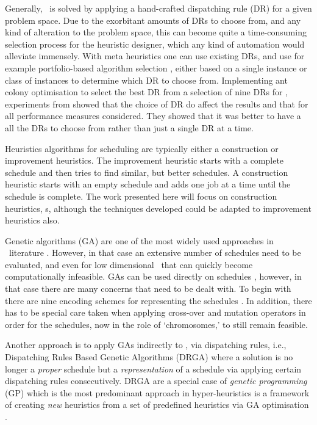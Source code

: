 \documentclass[smallextended]{svjour3}
\begin{document}
Generally, \jsp\ is solved by applying a hand-crafted dispatching rule (DR) for 
a given problem space. 
Due to the exorbitant amounts of DRs to choose from, and any kind of alteration 
to the problem space, this can become quite a time-consuming selection process 
for the heuristic designer, which any kind of automation would alleviate 
immensely. 
With meta heuristics one can use existing DRs, and use for example 
portfolio-based algorithm selection \cite{Rice76,Gomes01}, either based on a 
single instance or class of instances \cite{Xu07} to determine which DR to 
choose from. 
Implementing ant colony optimisation to select the best DR 
from a selection of nine DRs for \JSP, experiments from \cite{Korytkowski13} 
showed that the choice of DR do affect the results and that for all performance 
measures considered. They showed that it was better to have a all the DRs to 
choose from rather than just a single DR at a time.

Heuristics algorithms for scheduling are typically either a construction or 
improvement heuristics. The improvement heuristic starts with a complete 
schedule and then tries to find similar, but better schedules.  A construction 
heuristic starts with an empty schedule and adds one job at a time until the 
schedule is complete. The work presented here will focus on construction 
heuristics, \dr s, although the techniques developed could be adapted to 
improvement heuristics also. 

Genetic algorithms (GA) are one of the most widely used approaches in \JSP\ 
literature \cite{Pinedo08}. However, in that case an extensive number of 
schedules need to be evaluated, and even for low dimensional \JSP\ that can 
quickly become computationally infeasible.
GAs can be used directly on schedules 
\cite{Cheng96,Cheng99,Tsai07,Qing-dao-er-ji12,Ak12,Meeran12}, however, in that 
case there are many concerns that need to be dealt with. To begin with there 
are nine encoding schemes for representing the schedules \cite{Cheng96}. 
In addition, there has to be special care taken when applying cross-over and 
mutation operators in order for the schedules, now in the role of 
`chromosomes,' to still remain feasible. 

Another approach is to apply GAs indirectly to \JSP , via dispatching rules, 
i.e., Dispatching Rules Based Genetic Algorithms (DRGA) 
\cite{Vazquez-Rodriguez09,Dhingra10,Nguyen13} where a solution is no longer a 
\emph{proper} schedule but a \emph{representation} of a schedule via applying 
certain dispatching rules consecutively. 
DRGA are a special case of \emph{genetic programming} (GP) \cite{Koza05} which 
is 
the most predominant approach in hyper-heuristics is a framework of creating 
\emph{new} heuristics from a set of  predefined heuristics via GA optimisation 
\cite{Burke10}. 
\end{document}
